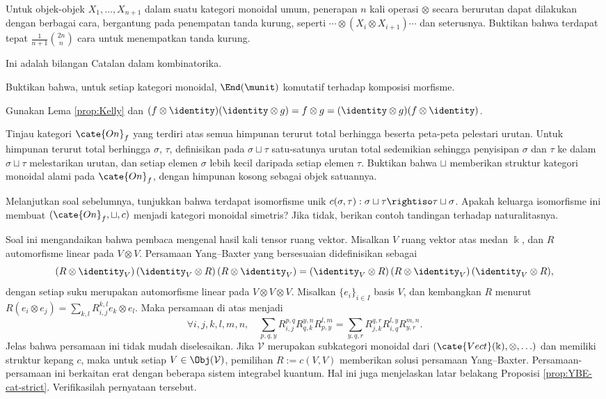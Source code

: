 \begin{Exercises}
	\item Untuk objek-objek $X_1, \ldots, X_{n+1}$ dalam suatu kategori monoidal umum, penerapan $n$ kali operasi $\otimes$ secara berurutan dapat dilakukan dengan berbagai cara, bergantung pada penempatan tanda kurung, seperti $\cdots \otimes (X_i \otimes X_{i+1}) \cdots$ dan seterusnya. Buktikan bahwa terdapat tepat $\frac{1}{n+1} \binom{2n}{n}$ cara untuk menempatkan tanda kurung. \begin{hint} Ini adalah bilangan Catalan dalam kombinatorika. \end{hint}
	\item Buktikan bahwa, untuk setiap kategori monoidal, $\End(\munit)$ komutatif terhadap komposisi morfisme. \begin{hint} Gunakan Lema \ref{prop:Kelly} dan $(f \otimes \identity)(\identity \otimes g) = f \otimes g = (\identity \otimes g) (f \otimes \identity)$.\end{hint}
	\item Tinjau kategori $\cate{On}_f$ yang terdiri atas semua himpunan terurut total berhingga beserta peta-peta pelestari urutan. Untuk himpunan terurut total berhingga $\sigma$, $\tau$, definisikan pada $\sigma \sqcup \tau$ satu-satunya urutan total sedemikian sehingga penyisipan $\sigma$ dan $\tau$ ke dalam $\sigma \sqcup \tau$ melestarikan urutan, dan setiap elemen $\sigma$ lebih kecil daripada setiap elemen $\tau$. Buktikan bahwa $\sqcup$ memberikan struktur kategori monoidal alami pada $\cate{On}_f$, dengan himpunan kosong sebagai objek satuannya.
	\item Melanjutkan soal sebelumnya, tunjukkan bahwa terdapat isomorfisme unik $c(\sigma, \tau): \sigma \sqcup \tau \rightiso \tau \sqcup \sigma$. Apakah keluarga isomorfisme ini membuat $(\cate{On}_f, \sqcup, c)$ menjadi kategori monoidal simetris? Jika tidak, berikan contoh tandingan terhadap naturalitasnya.
	\item Soal ini mengandaikan bahwa pembaca mengenal hasil kali tensor ruang vektor. Misalkan $V$ ruang vektor atas medan $\Bbbk$, dan $R$ automorfisme linear pada $V \otimes V$. Persamaan Yang--Baxter yang bersesuaian didefinisikan sebagai
		\[ (R \otimes \identity_V) \, (\identity_V \otimes R) \, (R \otimes \identity_V) = (\identity_V \otimes R) \, (R \otimes \identity_V) \, (\identity_V \otimes R) , \]
		dengan setiap suku merupakan automorfisme linear pada $V \otimes V \otimes V$. Misalkan $\{e_i\}_{i \in I}$ basis $V$, dan kembangkan $R$ menurut $R(e_i \otimes e_j) = \sum_{k,l} R^{k,l}_{i,j} e_k \otimes e_l$. Maka persamaan di atas menjadi
		\[ \forall i,j,k,l,m,n, \quad \sum_{p,q,y} R^{p,q}_{i,j} R^{y,n}_{q,k} R^{l,m}_{p,y} = \sum_{y,q,r} R^{q,r}_{j,k} R^{l,y}_{i,q} R^{m,n}_{y,r}.  \]
		Jelas bahwa persamaan ini tidak mudah diselesaikan. Jika $\mathcal{V}$ merupakan subkategori monoidal dari $(\cate{Vect}(\Bbbk), \otimes, \ldots)$ dan memiliki struktur kepang $c$, maka untuk setiap $V \in \Obj(\mathcal{V})$, pemilihan $R := c(V,V)$ memberikan solusi persamaan Yang--Baxter. Persamaan-persamaan ini berkaitan erat dengan beberapa sistem integrabel kuantum. Hal ini juga menjelaskan latar belakang Proposisi \ref{prop:YBE-cat-strict}. Verifikasilah pernyataan tersebut.
		

\end{Exercises}
